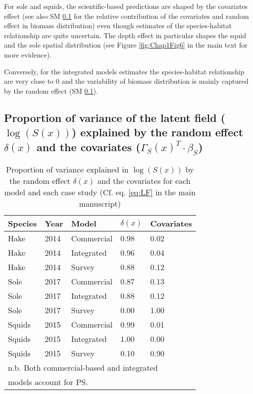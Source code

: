 For sole and squids, the scientific-based predictions are shaped by the covariates effect (see also SM \ref{appendix:ProprVarLF} for the relative contribution of the covariates and random effect in biomass distribution) even though estimates of the species-habitat relationship are quite uncertain. The depth effect in particular shapes the squid and the sole spatial distribution (see Figure    \ref{fig:Chap1Fig6} in the main text for more evidence).

Conversely, for the integrated models estimates the species-habitat relationship are very close to 0 and the variability of biomass distribution is mainly captured by the random effect (SM \ref{appendix:ProprVarLF}).

\subsection{Proportion of variance of the latent field (\(\log(S(x))\)) explained by the random effect \(\delta(x)\) and the covariates (\(\Gamma_S(x)^T \cdot \beta_S\))}\label{appendix:ProprVarLF}

\begin{center}
\begin{longtable}{lllll}
\caption{Proportion of variance explained in \(\log(S(x))\) by the random effect  \(\delta(x)\) and the covariates for each model and each case study (Cf. eq. \ref{eq:LF} in the main manuscript)}\label{tab:ProprVarLF} \\

\textbf{Species} & \textbf{Year} & \textbf{Model}      & \textbf{\(\delta(x)\)} & \textbf{Covariates}  \\
\hline
Hake    & 2014 & Commercial & 0.98                                                       & 0.02        \\
Hake    & 2014 & Integrated & 0.96                                                       & 0.04        \\
Hake    & 2014 & Survey     & 0.88                                                       & 0.12        \\
Sole    & 2017 & Commercial & 0.87                                                       & 0.13        \\
Sole    & 2017 & Integrated & 0.88                                                       & 0.12        \\
Sole    & 2017 & Survey     & 0.00                                                       & 1.00        \\
Squids  & 2015 & Commercial & 0.99                                                       & 0.01        \\
Squids  & 2015 & Integrated & 1.00                                                       & 0.00        \\
Squids  & 2015 & Survey     & 0.10                                                       & 0.90 \\      
\multicolumn{5}{l}{n.b. Both commercial-based and integrated} \\
\multicolumn{5}{l}{models account for PS.} \\
\end{longtable}
\end{center}

